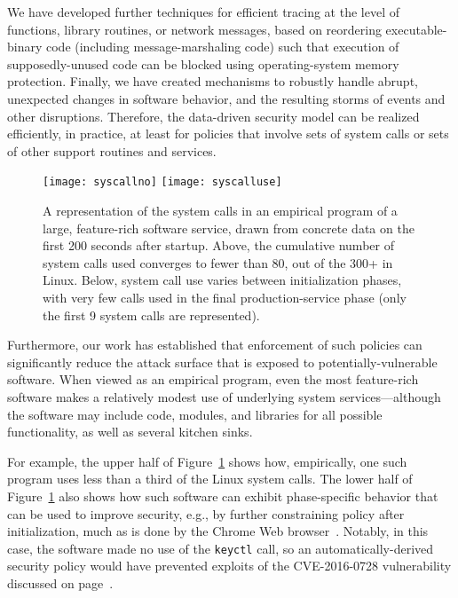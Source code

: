\documentclass{IEEEtran}
\begin{document}
We have developed further techniques for efficient tracing 
at the level of functions, library routines, or network messages, 
based on reordering executable-binary code (including message-marshaling code)
such that execution of supposedly-unused code
can be blocked
using operating-system memory protection.
Finally, we have created mechanisms to robustly handle
abrupt, unexpected changes in software behavior,
and the resulting storms of events and other disruptions.
Therefore,
the data-driven security model can be realized efficiently, in practice,
at least for policies that involve sets of system calls or sets of other support routines and services.



\begin{figure}[t]
\centering
\texttt{[image: syscallno]}
\texttt{[image: syscalluse]}
\caption{
A representation of the system calls in an empirical program of a large, feature-rich software service,
drawn from concrete data on the first 200 seconds after startup. 
Above, the cumulative number of system calls used converges to fewer than 80, out of the 300+ in Linux.
Below, 
system call use varies between initialization phases, 
with very few calls used in the final production-service phase
(only the first 9 system calls are represented).}\label{fig:chips}
\end{figure}


Furthermore, our work has established
that enforcement of such policies can significantly reduce the attack surface
that is exposed to potentially-vulnerable software.
When viewed as an empirical program,
even the most feature-rich software
makes a relatively modest use of underlying system services---although
the software may include code, modules, and libraries for
all possible functionality, as well as several kitchen sinks.


For example, 
the upper half of
Figure~\ref{fig:chips}
shows how, empirically, one such program uses less than a third of the Linux system calls.
The lower half of Figure~\ref{fig:chips} also shows
how such software can exhibit phase-specific behavior
that can be used to improve security,
e.g., by further constraining policy after initialization,
much as is done by the Chrome Web browser~\cite{ChromeSandbox}.
Notably,
in this case,
the software made no use of the \texttt{keyctl} call,
so an automatically-derived security policy
would have prevented exploits of the CVE-2016-0728 vulnerability discussed on page~\pageref{ref:keyctl}.
\end{document}

